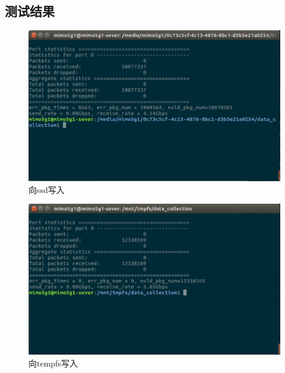 \documentclass{article}
\begin{document}
\subsection{测试结果}
\begin{figure}[H]
	\centering
	\includegraphics[width = .8\textwidth]{res5ssd.png}
	\caption{向ssd写入}
\end{figure}
\begin{figure}[H]
	\centering
	\includegraphics[width = .8\textwidth]{res5ram.png}
	\caption{向tempfs写入}
\end{figure}

\end{document}

